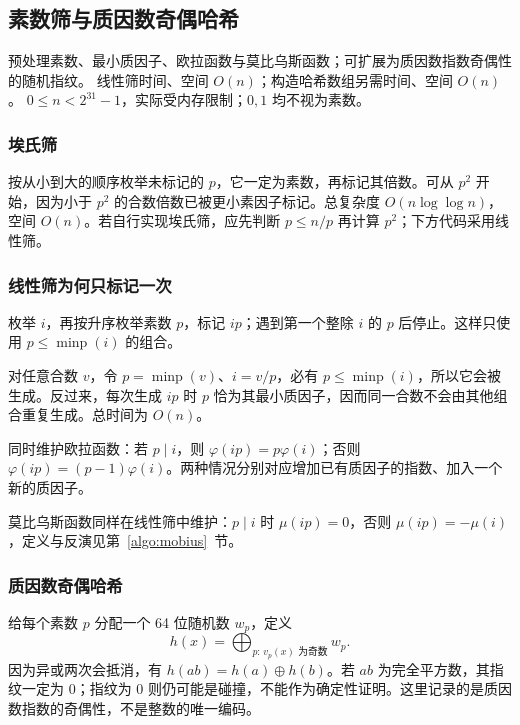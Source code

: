 \subsection{素数筛与质因数奇偶哈希}
\label{algo:sieve}
\AlgorithmInfo
    {预处理素数、最小质因子、欧拉函数与莫比乌斯函数；可扩展为质因数指数奇偶性的随机指纹。}
    {线性筛时间、空间 $O(n)$；构造哈希数组另需时间、空间 $O(n)$。}
    {$0\leq n<2^{31}-1$，实际受内存限制；$0,1$ 均不视为素数。}

\subsubsection*{埃氏筛}
按从小到大的顺序枚举未标记的 $p$，它一定为素数，再标记其倍数。可从 $p^2$ 开始，因为小于 $p^2$ 的合数倍数已被更小素因子标记。总复杂度 $O(n\log\log n)$，空间 $O(n)$。若自行实现埃氏筛，应先判断 $p\leq n/p$ 再计算 $p^2$；下方代码采用线性筛。

\subsubsection*{线性筛为何只标记一次}
枚举 $i$，再按升序枚举素数 $p$，标记 $ip$；遇到第一个整除 $i$ 的 $p$ 后停止。这样只使用 $p\leq\operatorname{minp}(i)$ 的组合。

对任意合数 $v$，令 $p=\operatorname{minp}(v)$、$i=v/p$，必有 $p\leq\operatorname{minp}(i)$，所以它会被生成。反过来，每次生成 $ip$ 时 $p$ 恰为其最小质因子，因而同一合数不会由其他组合重复生成。总时间为 $O(n)$。

同时维护欧拉函数：若 $p\mid i$，则 $\varphi(ip)=p\varphi(i)$；否则 $\varphi(ip)=(p-1)\varphi(i)$。两种情况分别对应增加已有质因子的指数、加入一个新的质因子。

莫比乌斯函数同样在线性筛中维护：$p\mid i$ 时 $\mu(ip)=0$，否则 $\mu(ip)=-\mu(i)$，定义与反演见第~\ref{algo:mobius}~节。

\subsubsection*{质因数奇偶哈希}
给每个素数 $p$ 分配一个 64 位随机数 $w_p$，定义
\[
    h(x)=\bigoplus_{p:\,v_p(x)\text{ 为奇数}}w_p.
\]
因为异或两次会抵消，有 $h(ab)=h(a)\mathbin{\oplus}h(b)$。若 $ab$ 为完全平方数，其指纹一定为 $0$；指纹为 $0$ 则仍可能是碰撞，不能作为确定性证明。这里记录的是质因数指数的奇偶性，不是整数的唯一编码。

